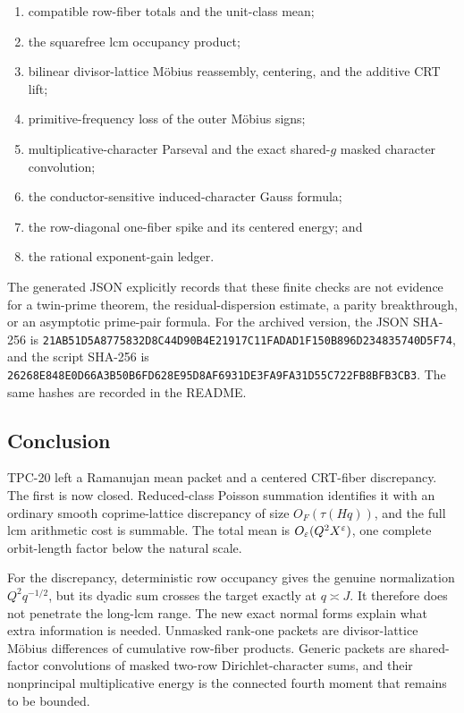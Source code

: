 \begin{enumerate}[label=\textup{(\roman*)}]
 \item compatible row-fiber totals and the unit-class mean;
 \item the squarefree lcm occupancy product;
 \item bilinear divisor-lattice M\"obius reassembly, centering, and the
 additive CRT lift;
 \item primitive-frequency loss of the outer M\"obius signs;
 \item multiplicative-character Parseval and the exact shared-\(g\)
 masked character convolution;
 \item the conductor-sensitive induced-character Gauss formula;
 \item the row-diagonal one-fiber spike and its centered energy; and
 \item the rational exponent-gain ledger.
\end{enumerate}

The generated JSON explicitly records that these finite checks are not
evidence for a twin-prime theorem, the residual-dispersion estimate, a
parity breakthrough, or an asymptotic prime-pair formula.  For the
archived version, the JSON SHA-256 is
\nolinkurl{21AB51D5A8775832D8C44D90B4E21917C11FADAD1F150B896D234835740D5F74},
and the script SHA-256 is
\nolinkurl{26268E848E0D66A3B50B6FD628E95D8AF6931DE3FA9FA31D55C722FB8BFB3CB3}.
The same hashes are recorded in the README.

\subsection{Conclusion}

TPC-20 left a Ramanujan mean packet and a centered CRT-fiber
discrepancy.  The first is now closed.  Reduced-class Poisson summation
identifies it with an ordinary smooth coprime-lattice discrepancy of
size \(O_F(\tau(Hq))\), and the full lcm arithmetic cost is summable.
The total mean is \(O_\varepsilon(Q^2X^\varepsilon)\), one complete orbit-length
factor below the natural scale.

For the discrepancy, deterministic row occupancy gives the genuine
normalization \(Q^2q^{-1/2}\), but its dyadic sum crosses the target
exactly at \(q\asymp J\).  It therefore does not penetrate the long-lcm
range.  The new exact normal forms explain what extra information is
needed.  Unmasked rank-one packets are divisor-lattice M\"obius
differences of cumulative row-fiber products.  Generic packets are
shared-factor convolutions of masked two-row Dirichlet-character sums,
and their nonprincipal multiplicative energy is the connected fourth
moment that remains to be bounded.

